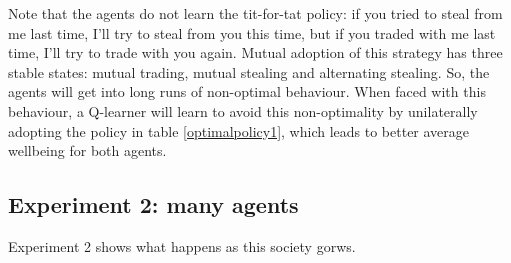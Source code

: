 \documentclass[a4paper]{report}
\begin{document}
Note that the agents do not learn the tit-for-tat policy: if you tried to steal from me last time, I'll try to steal from you this time, but if you traded with me last time, I'll try to trade with you again. Mutual adoption of this strategy has three stable states: mutual trading, mutual stealing and alternating stealing. So, the agents will get into long runs of non-optimal behaviour. When faced with this behaviour, a Q-learner will learn to avoid this non-optimality by unilaterally adopting the policy in table \ref{optimalpolicy1}, which leads to better average wellbeing for both agents.

\subsection{Experiment 2: many agents}

Experiment 2 shows what happens as this society gorws.
\end{document}

